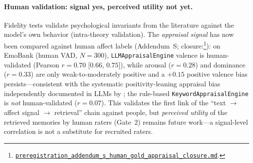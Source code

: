 \documentclass[11pt]{article}
\newcommand{\repourl}{https://github.com/gianlucamazza/emotional-memory}%
\begin{document}
\paragraph{Human validation: signal yes, perceived utility not yet.}
Fidelity tests validate psychological invariants from the literature against the
model's own behavior (intra-theory validation). The \emph{appraisal signal} has now
been compared against human affect labels (Addendum~S; closure:\footnote{%
\href{\repourl/blob/main/benchmarks/preregistration\_addendum\_s\_human\_gold\_appraisal\_closure.md}%
{\texttt{preregistration\_addendum\_s\_human\_gold\_appraisal\_closure.md}}.}): on
EmoBank \citep{buechel2017emobank} (human VAD, $N=300$), \texttt{LLMAppraisalEngine}
valence is human-validated (Pearson $r=0.70$ [$0.66$, $0.75$]), while arousal
($r=0.28$) and dominance ($r=0.33$) are only weak-to-moderately positive and a
$+0.15$ positive valence bias persists---consistent with the systematic
positivity-leaning appraisal bias independently documented in LLMs by
\citet{tak2025aware}; the rule-based \texttt{KeywordAppraisalEngine}
is \emph{not} human-validated ($r=0.07$). This validates the first link of the
``text $\to$ affect signal $\to$ retrieval'' chain against people, but \emph{perceived
utility} of the retrieved memories by human raters (Gate~2) remains future work---a
signal-level correlation is not a substitute for recruited raters.
\end{document}
